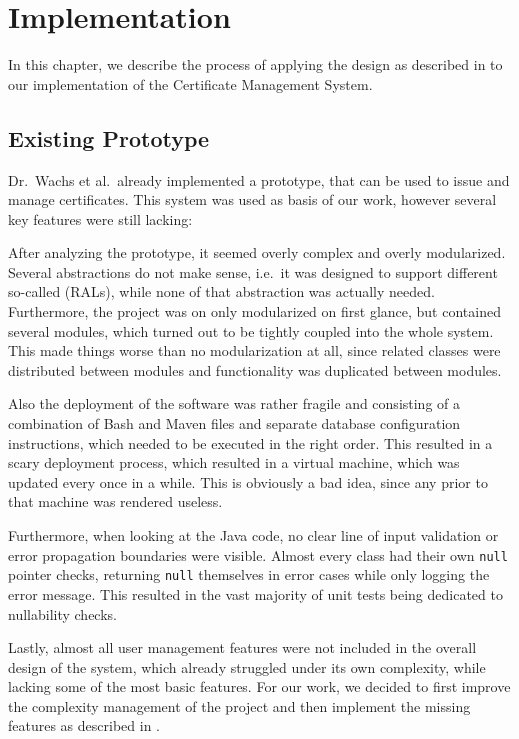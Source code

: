\chapter{Implementation}\label{ch:implementation}
In this chapter, we describe the process of applying the design as described in  to our implementation
of the Certificate Management System.

\section{Existing Prototype}\label{sec:exisingPrototype}
Dr.\ Wachs et al.\ already implemented a prototype, that can be used to issue and manage certificates.
This system was used as basis of our work, however several key features were still lacking:

After analyzing the prototype, it seemed overly complex and overly modularized.
Several abstractions do not make sense, i.e.\ it was designed to support different so-called  (RALs), while none of that abstraction was actually needed.
Furthermore, the project was on only modularized on first glance, but contained several  modules, which
turned out to be tightly coupled into the whole system.
This made things worse than no modularization at all, since related classes were distributed between modules and
functionality was duplicated between modules.

Also the deployment of the software was rather fragile and consisting of a combination of Bash and Maven files and
separate database configuration instructions, which needed to be executed in the right order.
This resulted in a scary deployment process, which resulted in a virtual machine, which was updated every once in a
while.
This is obviously a bad idea, since any  prior to that machine was rendered useless.

Furthermore, when looking at the Java code, no clear line of input validation or error propagation boundaries were
visible.
Almost every class had their own \lstinline{null} pointer checks, returning \lstinline{null} themselves in error cases
while only logging the error message.
This resulted in the vast majority of unit tests being dedicated to nullability checks.

Lastly, almost all user management features were not included in the overall design of the system, which already
struggled under its own complexity, while lacking some of the most basic features.
For our work, we decided to first improve the complexity management of the project and then implement the missing
features as described in .

